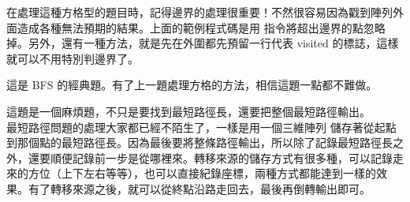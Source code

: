 \documentclass[main.tex]{subfiles}
\begin{document}
在處理這種方格型的題目時，記得邊界的處理很重要！不然很容易因為戳到陣列外面造成各種無法預期的結果。上面的範例程式碼是用  指令將超出邊界的點忽略掉。另外，還有一種方法，就是先在外圍都先預留一行代表 visited 的標誌，這樣就可以不用特別判邊界了。\\


這是 BFS 的經典題。有了上一題處理方格的方法，相信這題一點都不難做。\\


這題是一個麻煩題，不只是要找到最短路徑長，還要把整個最短路徑輸出。\\

最短路徑問題的處理大家都已經不陌生了，一樣是用一個三維陣列  儲存著從起點到那個點的最短路徑長。因為最後要將整條路徑輸出，所以除了記錄最短路徑長之外，還要順便記錄前一步是從哪裡來。轉移來源的儲存方式有很多種，可以記錄走來的方位（上下左右等等），也可以直接紀錄座標，兩種方式都能達到一樣的效果。有了轉移來源之後，就可以從終點沿路走回去，最後再倒轉輸出即可。\\
\end{document}
